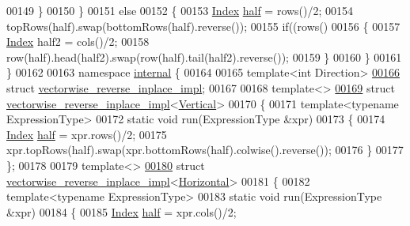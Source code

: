 \begin{DoxyCode}
00149     \}
00150   \}
00151   \textcolor{keywordflow}{else}
00152   \{
00153     \hyperlink{namespace_eigen_a62e77e0933482dafde8fe197d9a2cfde}{Index} \hyperlink{struct_eigen_1_1half}{half} = rows()/2;
00154     topRows(half).swap(bottomRows(half).reverse());
00155     \textcolor{keywordflow}{if}((rows()%
00156     \{
00157       \hyperlink{namespace_eigen_a62e77e0933482dafde8fe197d9a2cfde}{Index} half2 = cols()/2;
00158       row(half).head(half2).swap(row(half).tail(half2).reverse());
00159     \}
00160   \}
00161 \}
00162 
00163 \textcolor{keyword}{namespace }\hyperlink{namespaceinternal}{internal} \{
00164   
00165 \textcolor{keyword}{template}<\textcolor{keywordtype}{int} Direction>
\hyperlink{struct_eigen_1_1internal_1_1vectorwise__reverse__inplace__impl}{00166} \textcolor{keyword}{struct }\hyperlink{struct_eigen_1_1internal_1_1vectorwise__reverse__inplace__impl}{vectorwise\_reverse\_inplace\_impl};
00167 
00168 \textcolor{keyword}{template}<>
\hyperlink{struct_eigen_1_1internal_1_1vectorwise__reverse__inplace__impl_3_01_vertical_01_4}{00169} \textcolor{keyword}{struct }\hyperlink{struct_eigen_1_1internal_1_1vectorwise__reverse__inplace__impl}{vectorwise\_reverse\_inplace\_impl}<\hyperlink{group__enums_ggad49a7b3738e273eb00932271b36127f7addca718e0564723df21d61b94b1198be}{Vertical}>
00170 \{
00171   \textcolor{keyword}{template}<\textcolor{keyword}{typename} ExpressionType>
00172   \textcolor{keyword}{static} \textcolor{keywordtype}{void} run(ExpressionType &xpr)
00173   \{
00174     \hyperlink{namespace_eigen_a62e77e0933482dafde8fe197d9a2cfde}{Index} \hyperlink{struct_eigen_1_1half}{half} = xpr.rows()/2;
00175     xpr.topRows(half).swap(xpr.bottomRows(half).colwise().reverse());
00176   \}
00177 \};
00178 
00179 \textcolor{keyword}{template}<>
\hyperlink{struct_eigen_1_1internal_1_1vectorwise__reverse__inplace__impl_3_01_horizontal_01_4}{00180} \textcolor{keyword}{struct }\hyperlink{struct_eigen_1_1internal_1_1vectorwise__reverse__inplace__impl}{vectorwise\_reverse\_inplace\_impl}<\hyperlink{group__enums_ggad49a7b3738e273eb00932271b36127f7aae8a16b3b9272683c1162915f6d892be}{Horizontal}>
00181 \{
00182   \textcolor{keyword}{template}<\textcolor{keyword}{typename} ExpressionType>
00183   \textcolor{keyword}{static} \textcolor{keywordtype}{void} run(ExpressionType &xpr)
00184   \{
00185     \hyperlink{namespace_eigen_a62e77e0933482dafde8fe197d9a2cfde}{Index} \hyperlink{struct_eigen_1_1half}{half} = xpr.cols()/2;

\end{DoxyCode}

